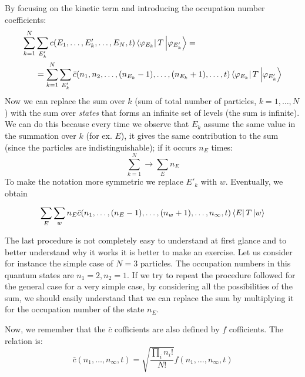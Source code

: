 \documentclass[../main/main.tex]{subfiles}
\begin{document}
By focusing on the kinetic term and introducing the occupation number coefficients:
\begin{equation*}
\begin{split}
  \sum_{k=1}^{N} & \sum_{E_k'}^{} c (E_1, \dots, E_k', \dots, E_N, t)
  \bra{\varphi _{E_k}} T \ket{\varphi _{E_k'}}= \\
  &= \sum_{k=1}^{N} \sum_{E_k'}^{} \bar{c} (n_1, n_2, \dots, (n_{E_k} -1), \dots, (n_{E_k}+1), \dots,t) \bra{\varphi _{E_k}} T \ket{\varphi _{E_k'}}
\end{split}
\end{equation*}
Now we can replace the sum over \( k \)  (sum of total number of particles, \( k=1, \dots,N \)) with the sum over \emph{states} that forms an infinite set of levels (the sum is infinite).
We can do this because every time we observe that \( E_k \) assume the same value in the summation over \( k \) (for ex. \( E \)), it gives the same contribution to the sum (since the particles are indistinguishable); if it occurs \( n_E \) times:
\begin{equation*}
  \sum_{k=1}^{N} \rightarrow \sum_{E}^{} n_E
\end{equation*}
To make the notation more symmetric we replace \( E'_k \) with \( w \).
Eventually, we obtain
\begin{equation}
  \sum_{E}^{} \sum_{w}^{} n_E \bar{c} (n_1, \dots, (n_E -1), \dots, (n_w+1), \dots, n_ \infty ,t) \bra{E} T \ket{w}
  \label{eq:2_1}
\end{equation}

\begin{example}{}{}
The last procedure is not completely easy to understand at first glance and to better understand why it works it is better to make an exercise.
Let us consider for instance the simple case of \( N=3 \) particles.
The occupation numbers in this quantum states are \( n_1 = 2, n_2 =1 \).
If we try to repeat the procedure followed for the general case for a very simple case, by considering all the possibilities of the sum, we should easily understand that we can replace the sum by multiplying it for the occupation number of the state \( n_E \).
\end{example}

Now, we remember that the \( \bar{c}  \) cofficients are also defined by \( f \)  cofficients. The relation is:
\begin{equation*}
  \bar{c} (n_1, \dots, n_ \infty , t) = \sqrt{\frac{\prod_{i}^{} n_i!}{N!}  } f(n_1, \dots, n_ \infty , t)
\end{equation*}
\end{document}
